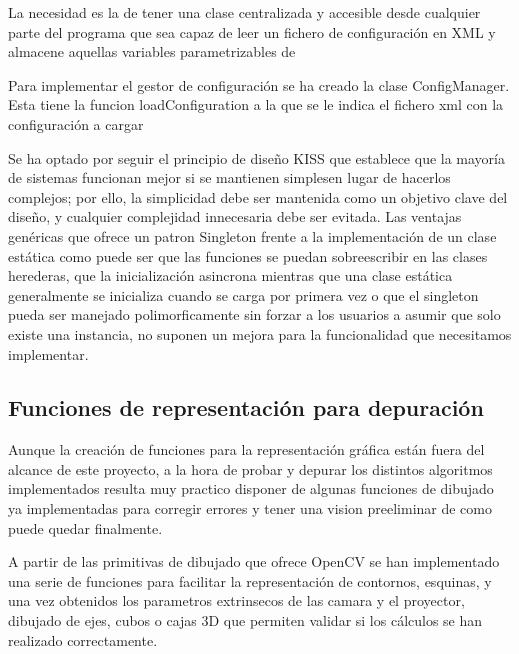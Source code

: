 La necesidad es la de tener una clase centralizada y accesible desde cualquier parte del programa que sea capaz de leer un fichero de configuración en XML y almacene aquellas variables parametrizables de

Para implementar el gestor de configuración se ha creado la clase ConfigManager. Esta tiene la funcion loadConfiguration a la que se le indica el fichero xml con la configuración a cargar 

Se ha optado por seguir el principio de diseño KISS que establece que la mayoría de sistemas funcionan mejor si se mantienen simplesen lugar de hacerlos complejos; por ello, la simplicidad debe ser mantenida como un objetivo clave del diseño, y cualquier complejidad innecesaria debe ser evitada. Las ventajas genéricas que ofrece un patron Singleton frente a la implementación de un clase estática como puede ser que las funciones se puedan sobreescribir en las clases herederas, que la inicialización asincrona mientras que una clase estática generalmente se inicializa cuando se carga por primera vez o que el singleton pueda ser manejado polimorficamente sin forzar a los usuarios a asumir que solo existe una instancia, no suponen un mejora para la funcionalidad que necesitamos implementar. 

\subsection{Funciones de representación para depuración}
Aunque la creación de funciones para la representación gráfica están fuera del alcance de este proyecto, a la hora de probar y depurar los distintos algoritmos implementados resulta muy practico disponer de algunas funciones de dibujado ya implementadas para corregir errores y tener una vision preeliminar de como puede quedar finalmente.

A partir de las primitivas de dibujado que ofrece OpenCV se han implementado una serie de funciones para facilitar la representación de contornos, esquinas, y una vez obtenidos los parametros extrinsecos de las camara y el proyector, dibujado de ejes, cubos o cajas 3D que permiten validar si los cálculos se han realizado correctamente.


